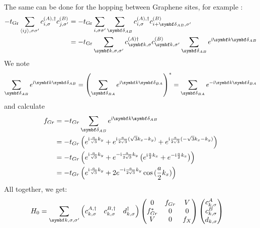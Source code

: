 \documentclass[../main.tex]{subfiles}
\begin{document}
The same can be done for the hopping between Graphene sites, for example :
\begin{align}
	-t_{\mathrm{Gr}} \sum_{\langle ij \rangle, \sigma \sigma^{\prime}} c_{i, \sigma}^{(A), \dagger} c_{j, \sigma^{\prime}}^{(B)}
	&= -t_{\mathrm{Gr}} \sum_{i, \sigma \sigma^{\prime}} \sum_{\vb{\delta}_{AB}} c_{i, \sigma}^{(A), \dagger} c_{i + \vb{\delta}_{AB} , \sigma^{\prime}}^{(B)} \\
	&= -t_{\mathrm{Gr}} \sum_{\vb{k}, \sigma, \sigma^{\prime}}  c_{\vb{k}, \sigma}^{(A) \dagger} c_{\vb{k}, \sigma^{\prime}}^{(B)} \sum_{\vb{\delta}_{AB}} e^{\iu \vb{k} \vb{\delta}_{AB}}
\end{align}
We note 
\begin{align}
	\sum_{\vb{\delta}_{AB}} e^{\iu \vb{k} \vb{\delta}_{AB}} = \left( \sum_{\vb{\delta}_{BA}} e^{\iu \vb{k} \vb{\delta}_{BA}} \right)^* = \sum_{\vb{\delta}_{BA}} e^{-\iu \vb{k} \vb{\delta}_{BA}}
\end{align}
and calculate
\begin{align}
	f_{Gr} &= -t_{Gr} \sum_{\vb{\delta}_{AB}} e^{\iu \vb{k} \vb{\delta}_{AB}} \\
	&= -t_{Gr} \left(
	e^{\iu \frac{a}{\sqrt{3}} k_y} +
	e^{\iu \frac{a}{2\sqrt{3}} (\sqrt{3} k_x - k_y)} +
	e^{\iu \frac{a}{2\sqrt{3}} (-\sqrt{3} k_x - k_y)} \right) \\
	&= -t_{Gr} \left(
	e^{\iu \frac{a}{\sqrt{3}} k_y} +
	e^{-\iu \frac{a}{2\sqrt{3}} k_y} \left(
	e^{\iu \frac{a}{2} k_x} + e^{-\iu \frac{a}{2} k_x}
	\right) \right) \\
	&= -t_{Gr} \left(
	e^{\iu \frac{a}{\sqrt{3}} k_y} +
	2 e^{-\iu \frac{a}{2\sqrt{3}} k_y}
	\cos{(\frac{a}{2} k_x)} \right)
\end{align}
All together, we get:
\begin{align}
	H_0 &= \sum_{\vb{k}, \sigma, \sigma^{\prime}} \begin{pmatrix} c_{k, \sigma}^{A, \dagger} & c_{k, \sigma}^{B, \dagger} & d_{k, \sigma}^{\dagger} \end{pmatrix}
	\begin{pmatrix}
		0 & f_{Gr} & V \\
		f_{Gr}^* & 0 & 0 \\
		V & 0 & f_{X}
	\end{pmatrix} \begin{pmatrix} c_{k, \sigma}^{A} \\ c_{k, \sigma}^{B} \\ d_{k, \sigma} \end{pmatrix}
	\label{eq:EG-X Hamiltonian non-interacting matrix appendix}
\end{align}
\end{document}
